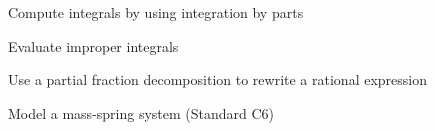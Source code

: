 \begin{readinessAssuranceOutcomes}
\item Compute integrals by using integration by parts
\item Evaluate improper integrals
\item Use a partial fraction decomposition to rewrite a rational expression
\item Model a mass-spring system (Standard C6)
\end{readinessAssuranceOutcomes}
